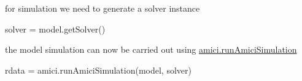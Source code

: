 for simulation we need to generate a solver instance \begin{DoxyVerb}solver = model.getSolver()
\end{DoxyVerb}


the model simulation can now be carried out using {\ttfamily \mbox{\hyperlink{namespaceamici_a46331a204e7511587acc2cc0b1ce7ed0}{amici.\+run\+Amici\+Simulation}}} \begin{DoxyVerb}rdata = amici.runAmiciSimulation(model, solver)\end{DoxyVerb}
 